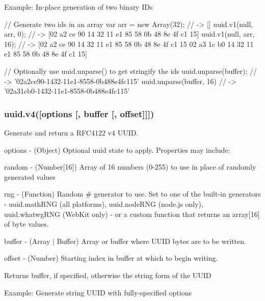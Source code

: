 Example\+: In-\/place generation of two binary I\+Ds


\begin{DoxyCode}
// Generate two ids in an array
var arr = new Array(32); // -> []
uuid.v1(null, arr, 0);   // -> [02 a2 ce 90 14 32 11 e1 85 58 0b 48 8e 4f c1 15]
uuid.v1(null, arr, 16);  // -> [02 a2 ce 90 14 32 11 e1 85 58 0b 48 8e 4f c1 15 02 a3 1c b0 14 32 11 e1 85
       58 0b 48 8e 4f c1 15]

// Optionally use uuid.unparse() to get stringify the ids
uuid.unparse(buffer);    // -> '02a2ce90-1432-11e1-8558-0b488e4fc115'
uuid.unparse(buffer, 16) // -> '02a31cb0-1432-11e1-8558-0b488e4fc115'
\end{DoxyCode}


\subsubsection*{uuid.\+v4(\mbox{[}{\ttfamily options} \mbox{[}, {\ttfamily buffer} \mbox{[}, {\ttfamily offset}\mbox{]}\mbox{]}\mbox{]})}

Generate and return a R\+F\+C4122 v4 U\+U\+ID.


\begin{DoxyItemize}
\item {\ttfamily options} -\/ (Object) Optional uuid state to apply. Properties may include\+:
\begin{DoxyItemize}
\item {\ttfamily random} -\/ (Number\mbox{[}16\mbox{]}) Array of 16 numbers (0-\/255) to use in place of randomly generated values
\item {\ttfamily rng} -\/ (Function) Random \# generator to use. Set to one of the built-\/in generators -\/ {\ttfamily uuid.\+math\+R\+NG} (all platforms), {\ttfamily uuid.\+node\+R\+NG} (node.\+js only), {\ttfamily uuid.\+whatwg\+R\+NG} (Web\+Kit only) -\/ or a custom function that returns an array\mbox{[}16\mbox{]} of byte values.
\end{DoxyItemize}
\item {\ttfamily buffer} -\/ (Array $\vert$ Buffer) Array or buffer where U\+U\+ID bytes are to be written.
\item {\ttfamily offset} -\/ (Number) Starting index in {\ttfamily buffer} at which to begin writing.
\end{DoxyItemize}

Returns {\ttfamily buffer}, if specified, otherwise the string form of the U\+U\+ID

Example\+: Generate string U\+U\+ID with fully-\/specified options


